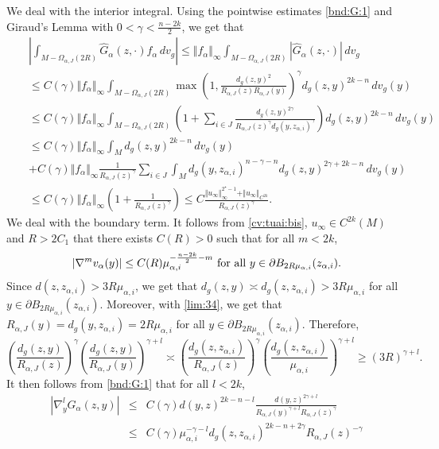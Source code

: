 \documentclass[reqno]{amsart}
\def \crit {2^\star}
\def \mai {\mu_{\alpha,i}}
\def \zai {z_{\alpha,i}}
\begin{document}
 We deal with the interior integral. Using the pointwise estimates \eqref{bnd:G:1} and Giraud's Lemma with $0<\gamma<\frac{n-2k}{2}$, we get that
\begin{eqnarray*}
&&\left|\int_{M-\Omega_{\alpha,J}(2R)}\hat{G}_\alpha(z,\cdot) f_\alpha\, dv_g\right|\leq  \Vert f_\alpha\Vert_\infty\int_{M-\Omega_{\alpha,J}(2R)}|\hat{G}_\alpha(z,\cdot)|\, dv_g\\
&&\leq C(\gamma)\Vert f_\alpha\Vert_\infty\int_{M-\Omega_{\alpha,J}(2R)}\max\left(1, \frac{d_g(z,y)^2}{R_{\alpha, J}(z)R_{\alpha, J}(y)} \right)^\gamma d_g(z,y)^{2k-n}\, dv_g(y)\\
&&\leq C(\gamma)\Vert f_\alpha\Vert_\infty\int_{M-\Omega_{\alpha,J}(2R)}\left(1 +\sum_{i\in J}\frac{d_g(z,y)^{2\gamma}}{R_{\alpha, J}(z)^\gamma d_g(y,\zai)^\gamma} \right) d_g(z,y)^{2k-n}\, dv_g(y)\\
&&\leq C(\gamma)\Vert f_\alpha\Vert_\infty \int_{M}d_g(z,y)^{2k-n}\, dv_g(y) \\
&& +C(\gamma)\Vert f_\alpha\Vert_\infty\frac{1}{R_{\alpha, J}(z)^\gamma}\sum_{i\in J}\int_{M}d_g(y,\zai)^{n-\gamma-n} d_g(z,y)^{2\gamma+2k-n}\, dv_g(y) \\
&&\leq C(\gamma)\Vert f_\alpha\Vert_\infty\left(1+\frac{1}{R_{\alpha, J}(z)^\gamma}\right)\leq C\frac{\Vert u_\infty \Vert_\infty^{\crit-1} +\Vert u_\infty\Vert_{C^{2k}}}{R_{\alpha, J}(z)^\gamma}.
\end{eqnarray*}
We deal with the boundary term. It follows from  \eqref{cv:tuai:bis}, $u_\infty\in C^{2k}(M)$ and $R>2C_1$ that there exists $C(R)>0$ such that for all $m<2k$,
$$|\nabla^m v_\alpha(y)|\leq C(R)\mai^{-\frac{n-2k}{2}-m}\hbox{ for all }y\in \partial B_{2R\mai}(\zai).$$
Since $d(z,\zai)>3R\mai$, we get that $d_g(z,y)\asymp d_g(z,\zai)>3R\mai$ for all $y\in \partial B_{2R\mai}(\zai)$. Moreover, with \eqref{lim:34}, we get that $R_{\alpha, J}(y)=d_g(y,\zai)=2R\mai$ for all $y\in \partial B_{2R\mai}(\zai)$. Therefore, 
$$\left(\frac{d_g(z,y)}{R_{\alpha,J}(z)}\right)^\gamma \left(\frac{d_g(z,y)}{R_{\alpha,J}(y)}\right)^{\gamma+l} \asymp \left(\frac{d_g(z,\zai)}{R_{\alpha,J}(z)}\right)^\gamma \left(\frac{d_g(z,\zai)}{\mai}\right)^{\gamma+l}\geq  \left(3R\right)^{\gamma+l}.$$
It then follows from \eqref{bnd:G:1} that for all $l<2k$,
\begin{eqnarray*}
|\nabla^l_y\hat{G}_\alpha(z,y)|&\leq& C(\gamma) d(y,z)^{2k-n-l}\frac{d(y,z)^{2\gamma+l}}{R_{\alpha, J}(y)^{\gamma+l}R_{\alpha, J}(z)^\gamma}\\
&\leq & C(\gamma) \mai^{-\gamma-l}d_g(z,\zai)^{2k-n+2\gamma}R_{\alpha, J}(z)^{-\gamma}
\end{eqnarray*}
\end{document}
